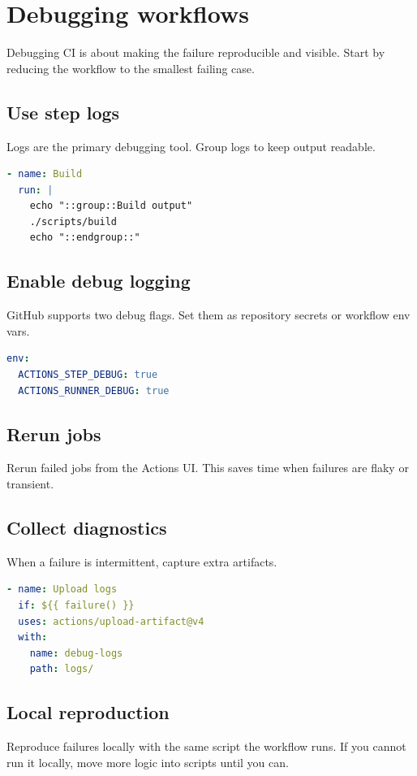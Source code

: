 \chapter{Debugging workflows}

Debugging CI is about making the failure reproducible and visible.
Start by reducing the workflow to the smallest failing case.

\section{Use step logs}
Logs are the primary debugging tool.
Group logs to keep output readable.

\begin{lstlisting}[language=YAML]
- name: Build
  run: |
    echo "::group::Build output"
    ./scripts/build
    echo "::endgroup::"
\end{lstlisting}

\section{Enable debug logging}
GitHub supports two debug flags.
Set them as repository secrets or workflow env vars.

\begin{lstlisting}[language=YAML]
env:
  ACTIONS_STEP_DEBUG: true
  ACTIONS_RUNNER_DEBUG: true
\end{lstlisting}

\section{Rerun jobs}
Rerun failed jobs from the Actions UI.
This saves time when failures are flaky or transient.

\section{Collect diagnostics}
When a failure is intermittent, capture extra artifacts.

\begin{lstlisting}[language=YAML]
- name: Upload logs
  if: ${{ failure() }}
  uses: actions/upload-artifact@v4
  with:
    name: debug-logs
    path: logs/
\end{lstlisting}

\section{Local reproduction}
Reproduce failures locally with the same script the workflow runs.
If you cannot run it locally, move more logic into scripts until you can.


